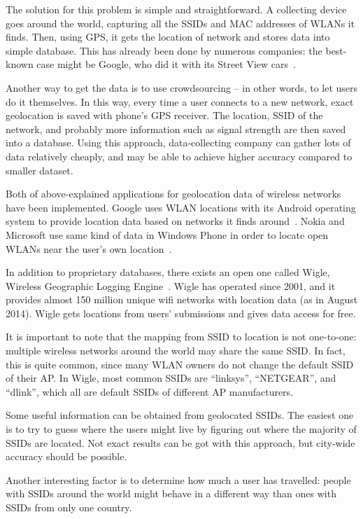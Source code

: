 \documentclass[12pt,a4paper,oneside,pdftex]{report}
\begin{document}
The solution for this problem is simple and straightforward. A collecting device goes around the world, capturing all the SSIDs and MAC addresses of WLANs it finds. Then, using GPS, it gets the location of network and stores data into simple database. This has already been done by numerous companies: the best-known case might be Google, who did it with its Street View cars~\cite{google_wifi_collection}. 

Another way to get the data is to use crowdsourcing -- in other words, to let users do it themselves. In this way, every time a user connects to a new network, exact geolocation is saved with phone's GPS receiver. The location, SSID of the network, and probably more information such as signal strength are then saved into a database. Using this approach, data-collecting company can gather lots of data relatively cheaply, and may be able to achieve higher accuracy compared to smaller dataset.

Both of above-explained applications for geolocation data of wireless networks have been implemented. Google uses WLAN locations with its Android operating system to provide location data based on networks it finds around~\cite{google_wifi_collection}. Nokia and Microsoft use same kind of data in Windows Phone in order to locate open WLANs near the user's own location~\cite{nokia_datasense}.

In addition to proprietary databases, there exists an open one called Wigle, Wireless Geographic Logging Engine~\cite{wigle}. Wigle has operated since 2001, and it provides almost 150 million unique wifi networks with location data (as in August 2014). Wigle gets locations from users' submissions and gives data access for free. 

It is important to note that the mapping from SSID to location is not one-to-one: multiple wireless networks around the world may share the same SSID. In fact, this is quite common, since many WLAN owners do not change the default SSID of their AP. In Wigle, most common SSIDs are ``linksys'', ``NETGEAR'', and ``dlink'', which all are default SSIDs of different AP manufacturers.

Some useful information can be obtained from geolocated SSIDs. The easiest one is to try to guess where the users might live by figuring out where the majority of SSIDs are located. Not exact results can be got with this approach, but city-wide accuracy should be possible.

Another interesting factor is to determine how much a user has travelled: people with SSIDs around the world might behave in a different way than ones with SSIDs from only one country. 
\end{document}
